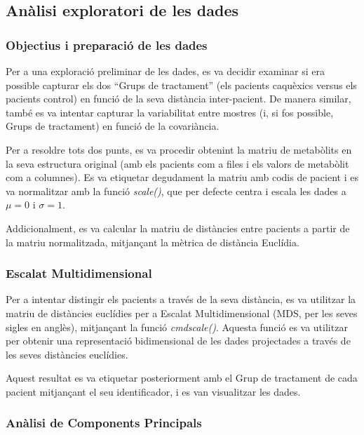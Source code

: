 \documentclass[
  a4paper]{article}
\begin{document}
\pagebreak

\subsection{Anàlisi exploratori de les
dades}\label{anuxe0lisi-exploratori-de-les-dades}

\subsubsection{Objectius i preparació de les
dades}\label{objectius-i-preparaciuxf3-de-les-dades}

Per a una exploració preliminar de les dades, es va decidir examinar si
era possible capturar els dos ``Grups de tractament'' (els pacients
caquèxics versus els pacients control) en funció de la seva distància
inter-pacient. De manera similar, també es va intentar capturar la
variabilitat entre mostres (i, si fos possible, Grups de tractament) en
funció de la covariància.

Per a resoldre tots dos punts, es va procedir obtenint la matriu de
metabòlits en la seva estructura original (amb els pacients com a files
i els valors de metabòlit com a columnes). Es va etiquetar degudament la
matriu amb codis de pacient i es va normalitzar amb la funció
\emph{scale()}, que per defecte centra i escala les dades a \(\mu = 0\)
i \(\sigma = 1\).

Addicionalment, es va calcular la matriu de distàncies entre pacients a
partir de la matriu normalitzada, mitjançant la mètrica de distància
Euclídia.

\subsubsection{Escalat Multidimensional}\label{escalat-multidimensional}

Per a intentar distingir els pacients a través de la seva distància, es
va utilitzar la matriu de distàncies euclídies per a Escalat
Multidimensional (MDS, per les seves sigles en anglès), mitjançant la
funció \emph{cmdscale()}. Aquesta funció es va utilitzar per obtenir una
representació bidimensional de les dades projectades a través de les
seves distàncies euclídies.

Aquest resultat es va etiquetar posteriorment amb el Grup de tractament
de cada pacient mitjançant el seu identificador, i es van visualitzar
les dades.

\subsubsection{Anàlisi de Components
Principals}\label{anuxe0lisi-de-components-principals}
\end{document}
